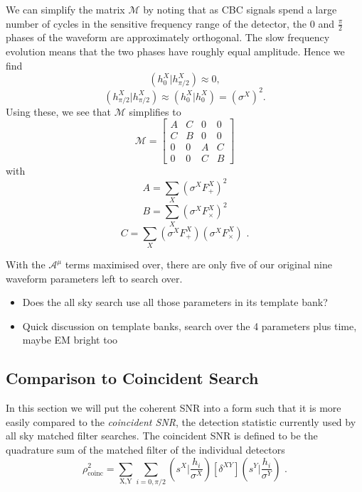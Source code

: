 \documentclass[11pt]{cuthesis}
\newcommand{\fs}{\text{ .}}
\begin{document}
We can simplify the matrix $\mathcal{M}$ by noting that as CBC signals spend a large number of cycles in the sensitive frequency range of the detector, the $0$ and $\frac{\pi}{2}$ phases of the waveform are approximately orthogonal. The slow frequency evolution means that the two phases have roughly equal amplitude. Hence we find 
\begin{equation}
(h_0^X|h_{\pi/2}^X)\approx 0 ,
\end{equation}
\begin{equation}
(h_{\pi/2}^X|h_{\pi/2}^X)\approx (h_0^X|h_0^X) = (\sigma^X)^2 \textbf{.}
\end{equation}
Using these, we see that $\mathcal{M}$  simplifies to
\[
\mathcal{M}
=
\begin{bmatrix}
A & C & 0 & 0 \\
C & B & 0 & 0 \\
0 & 0 & A & C \\
0 & 0 & C & B 
\end{bmatrix}
\] 
with 
\begin{equation}
A = \sum_X (\sigma^X F_+^X)^2
\end{equation}
\begin{equation}
B = \sum_X (\sigma^X F_\times^X)^2
\end{equation}
\begin{equation} \label{C eqn}
C = \sum_X (\sigma^X F_+^X)(\sigma^X F_\times^X) \fs
\end{equation}

With the  $\mathcal{A}^\mu$ terms maximised over, there are only five of our original nine waveform parameters left to search over. 

\begin{itemize}
\item Does the all sky search use all those parameters in its template bank?
\item Quick discussion on template banks, search over the 4 parameters plus time, maybe EM bright too
\end{itemize}


\subsection{Comparison to Coincident Search} \label{sec: coinc compare}
In this section we will put the coherent SNR into a form such that it is more easily compared to the \textit{coincident SNR}, the detection statistic currently used by all sky matched filter searches. The coincident SNR is defined to be the quadrature sum of the matched filter of the individual detectors
\begin{equation} \label{rhocoinc}
\rho^2_\text{coinc} = \sum_\text{X,Y} \sum_{i=0,\pi/2} \left( s^X \bigg| \frac{h_i}{\sigma^X} \right)[\delta^{XY}]\left( s^Y \bigg| \frac{h_i}{\sigma^Y} \right) \fs
\end{equation}
\end{document}
